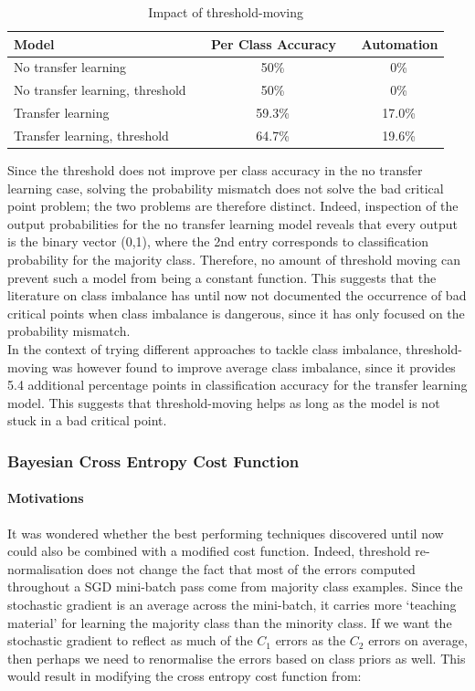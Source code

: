 \documentclass[a4paper,11pt]{article}
\begin{document}
\begin{table}[h!]
   \centering
    \begin{tabular}{|l|c|c|}
    \hline
    Model                            & ~ Per Class Accuracy  & ~ Automation  \\ 
    \hline
    No transfer learning             & ~  50\%               & ~ 0\%      \\
    No transfer learning, threshold  & ~  50\%               & ~ 0\%      \\
    \hline
    Transfer learning                & ~  59.3\%               & ~ 17.0\% \\
    Transfer learning, threshold     & ~  64.7\%               & ~ 19.6\% \\
    \hline
    \end{tabular}
    \caption {Impact of threshold-moving}
    \label{f51}
\end{table} 

Since the threshold does not improve per class accuracy in the no transfer learning case, solving the probability mismatch does not solve the bad critical point problem; the two problems are therefore distinct. Indeed, inspection of the output probabilities for the no transfer learning model reveals that every output is the binary vector (0,1), where the 2nd entry corresponds to classification probability for the majority class. Therefore, no amount of threshold moving can prevent such a model from being a constant function. This suggests that the literature on class imbalance has until now not documented the occurrence of bad critical points when class imbalance is dangerous, since it has only focused on the probability mismatch. \\

In the context of trying different approaches to tackle class imbalance, threshold-moving was however found to improve average class imbalance, since it provides 5.4 additional percentage points in classification accuracy for the transfer learning model. This suggests that threshold-moving helps as long as the model is not stuck in a bad critical point. 


\subsubsection{Bayesian Cross Entropy Cost Function}

\paragraph{Motivations}
It was wondered whether the best performing techniques discovered until now could also be combined with a modified cost function. Indeed, threshold re-normalisation does not change the fact that most of the errors computed throughout a SGD mini-batch pass come from majority class examples. Since the stochastic gradient is an average across the mini-batch, it carries more `teaching material' for learning the majority class than the minority class. If we want the stochastic gradient to reflect as much of the $C_1$ errors as the $C_2$ errors on average, then perhaps we need to renormalise the errors based on class priors as well. This would result in modifying the cross entropy cost function from: 
\end{document}
